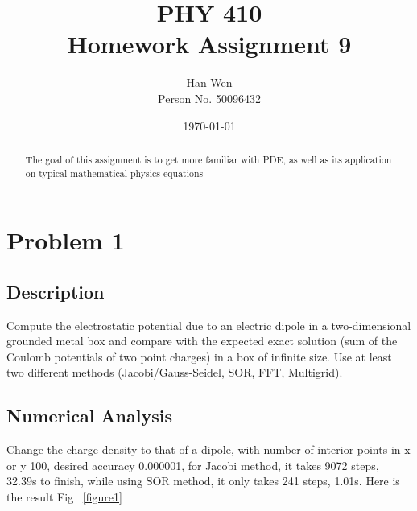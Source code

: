 \documentclass[11pt,letterpaper]{article}
\begin{document}
\title{PHY 410 \\ Homework Assignment 9}
\author{Han Wen \\ \tiny Person No. 50096432}
\date{\today}

\maketitle

\begin{abstract}
The goal of this assignment is to get more familiar with PDE, as well as its application on typical mathematical physics equations


\end{abstract}

\tableofcontents

\newpage
\section{Problem 1}

\subsection{Description}

Compute the electrostatic potential due to an electric dipole in a two-dimensional grounded metal box and compare with the expected exact solution (sum of the Coulomb potentials of two point charges) in a box of infinite size. Use at least two different methods (Jacobi/Gauss-Seidel, SOR, FFT, Multigrid).

\subsection{Numerical Analysis}


Change the charge density to that of a dipole, with number of interior points in x or y 100, desired accuracy 0.000001, for Jacobi method, it takes 9072 steps, 32.39s to finish, while using 
SOR method, it only takes 241 steps, 1.01s. Here is the result Fig ~\ref{figure1}
 
\end{document}
